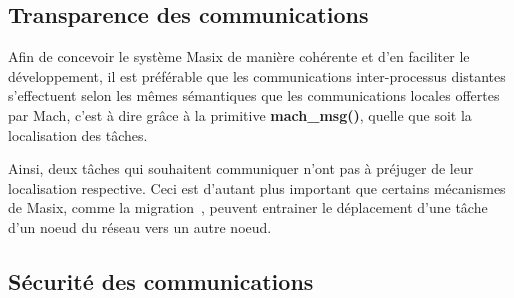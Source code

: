 \subsection{Transparence des communications}

Afin de concevoir le syst\`eme Masix de ma\-ni\`ere coh\'erente et d'en 
faciliter le d\'eveloppement, il est pr\'ef\'erable que les 
communications inter-processus distantes s'effectuent selon
les m\^emes s\'emantiques que les communications locales offertes par
Mach, c'est \`a dire gr\^ace \`a la primitive {\bf mach\_msg()}, quelle que soit la localisation des t\^aches.

Ainsi, deux t\^aches qui souhaitent communiquer n'ont pas \`a 
pr\'ejuger de leur localisation respective. Ceci est d'autant plus important que certains m\'ecanismes de Masix, comme la migration~\cite{athens95}, peuvent 
entrainer le d\'eplacement d'une t\^ache d'un noeud du r\'eseau 
vers un autre noeud. 

\subsection{S\'ecurit\'e des communications}

